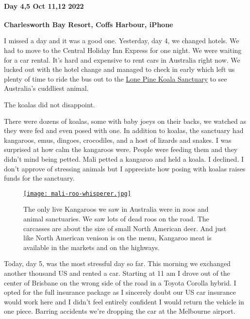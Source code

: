 \hypertarget{day-45-oct-1112-2022}{%
\paragraph{\texorpdfstring{\textbf{Day 4,5 Oct 11,12
2022}}{Day 4,5 Oct 11,12 2022}}\label{day-45-oct-1112-2022}}

\textbf{Charlesworth Bay Resort, Coffs Harbour, iPhone}

I missed a day and it was a good one. Yesterday, day 4, we changed
hotels. We had to move to the Central Holiday Inn Express for one night.
We were waiting for a car rental. It's hard and expensive to rent cars
in Australia right now. We lucked out with the hotel change and managed
to check in early which left us plenty of time to ride the bus out to
the \href{https://lonepinekoalasanctuary.com/}{Lone Pine Koala
Sanctuary} to see Australia's cuddliest animal.

The koalas did not disappoint.

There were dozens of koalas, some with baby joeys on their backs, we
watched as they were fed and even posed with one. In addition to koalas,
the sanctuary had kangaroos, emus, dingoes, crocodiles, and a host of
lizards and snakes. I was surprised at how calm the kangaroos were.
People were feeding them and they didn't mind being petted. Mali petted
a kangaroo and held a koala. I declined. I don't approve of stressing
animals but I appreciate how posing with koalas raises funds for the
sanctuary.

\captionsetup[figure]{labelformat=empty}
\begin{SCfigure}[50]
\centering
\href{https://conceptcontrol.smugmug.com/Trips/Overseas/Australia-New-Zealand-2022/i-FdKCt59/A}{\texttt{[image: mali-roo-whisperer.jpg]}}
\caption[The only live Kangaroos we saw were in zoos]{The only live Kangaroos we saw in Australia were in zoos and
animal sanctuaries. We saw lots of dead roos on the road. The carcasses
are about the size of small North American deer. And just like North
American venison is on the menu, Kangaroo meat is available in the
markets and on the highways.}
\label{fig:7548x2}
\end{SCfigure}

Today, day 5, was the most stressful day so far. This morning we
exchanged another thousand US and rented a car. Starting at 11 am I
drove out of the center of Brisbane on the wrong side of the road in a
Toyota Corolla hybrid. I opted for the full insurance package as I
sincerely doubt our US car insurance would work here and I didn't feel
entirely confident I would return the vehicle in one piece. Barring
accidents we're dropping the car at the Melbourne airport.

